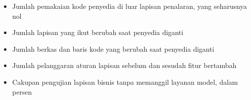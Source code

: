 \documentclass[11pt,a4paper]{article}
\begin{document}
\begin{itemize}[leftmargin=*]
  \item Jumlah pemakaian kode penyedia di luar lapisan penalaran, yang seharusnya nol
  \item Jumlah lapisan yang ikut berubah saat penyedia diganti
  \item Jumlah berkas dan baris kode yang berubah saat penyedia diganti
  \item Jumlah pelanggaran aturan lapisan sebelum dan sesudah fitur bertambah
  \item Cakupan pengujian lapisan bisnis tanpa memanggil layanan model, dalam persen
\end{itemize}



\end{document}

